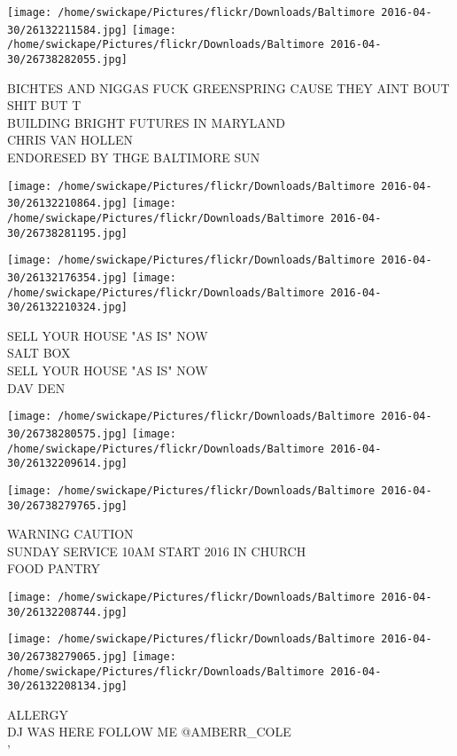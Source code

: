 \documentclass[10pt,letterpaper]{article}
\begin{document}
\texttt{[image: /home/swickape/Pictures/flickr/Downloads/Baltimore 2016-04-30/26132211584.jpg]}
\texttt{[image: /home/swickape/Pictures/flickr/Downloads/Baltimore 2016-04-30/26738282055.jpg]}

BICHTES AND NIGGAS FUCK GREENSPRING CAUSE THEY AINT BOUT SHIT BUT T\\
BUILDING BRIGHT FUTURES IN MARYLAND\\
CHRIS VAN HOLLEN\\
ENDORESED BY THGE BALTIMORE SUN
\pagebreak

\texttt{[image: /home/swickape/Pictures/flickr/Downloads/Baltimore 2016-04-30/26132210864.jpg]}
\texttt{[image: /home/swickape/Pictures/flickr/Downloads/Baltimore 2016-04-30/26738281195.jpg]}

\texttt{[image: /home/swickape/Pictures/flickr/Downloads/Baltimore 2016-04-30/26132176354.jpg]}
\texttt{[image: /home/swickape/Pictures/flickr/Downloads/Baltimore 2016-04-30/26132210324.jpg]}

SELL YOUR HOUSE "AS IS" NOW\\
SALT BOX\\
SELL YOUR HOUSE "AS IS" NOW\\
DAV DEN
\pagebreak

\texttt{[image: /home/swickape/Pictures/flickr/Downloads/Baltimore 2016-04-30/26738280575.jpg]}
\texttt{[image: /home/swickape/Pictures/flickr/Downloads/Baltimore 2016-04-30/26132209614.jpg]}

\texttt{[image: /home/swickape/Pictures/flickr/Downloads/Baltimore 2016-04-30/26738279765.jpg]}

WARNING CAUTION\\
SUNDAY SERVICE 10AM START 2016 IN CHURCH\\
FOOD PANTRY
\pagebreak

\texttt{[image: /home/swickape/Pictures/flickr/Downloads/Baltimore 2016-04-30/26132208744.jpg]}

\vspace{0.25in}
\texttt{[image: /home/swickape/Pictures/flickr/Downloads/Baltimore 2016-04-30/26738279065.jpg]}
\texttt{[image: /home/swickape/Pictures/flickr/Downloads/Baltimore 2016-04-30/26132208134.jpg]}

ALLERGY\\
DJ WAS HERE FOLLOW ME @AMBERR\_COLE\\
'
\pagebreak
\end{document}
